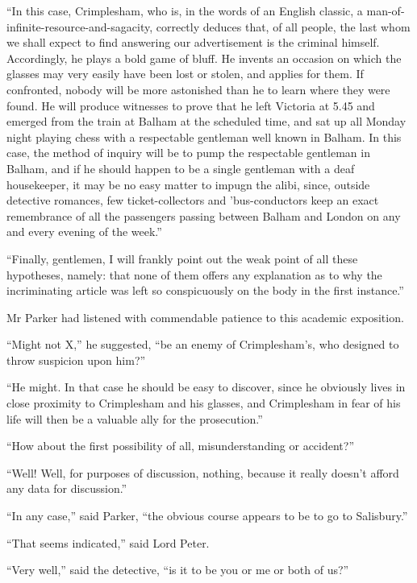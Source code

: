 \enquote{In this case, Crimplesham, who is, in the words of an English classic, a man-of-infinite-resource-and-sagacity, correctly deduces that, of all people, the last whom we shall expect to find answering our advertisement is the criminal himself. Accordingly, he plays a bold game of bluff. He invents an occasion on which the glasses may very easily have been lost or stolen, and applies for them. If confronted, nobody will be more astonished than he to learn where they were found. He will produce witnesses to prove that he left Victoria at 5.45 and emerged from the train at Balham at the scheduled time, and sat up all Monday night playing chess with a respectable gentleman well known in Balham. In this case, the method of inquiry will be to pump the respectable gentleman in Balham, and if he should happen to be a single gentleman with a deaf housekeeper, it may be no easy matter to impugn the alibi, since, outside detective romances, few ticket-collectors and ’bus-conductors keep an exact remembrance of all the passengers passing between Balham and London on any and every evening of the week.}

\enquote{Finally, gentlemen, I will frankly point out the weak point of all these hypotheses, namely: that none of them offers any explanation as to why the incriminating article was left so conspicuously on the body in the first instance.}

Mr Parker had listened with commendable patience to this academic exposition.

\enquote{Might not X,} he suggested, \enquote{be an enemy of Crimplesham’s, who designed to throw suspicion upon him?}

\enquote{He might. In that case he should be easy to discover, since he obviously lives in close proximity to Crimplesham and his glasses, and Crimplesham in fear of his life will then be a valuable ally for the prosecution.}

\enquote{How about the first possibility of all, misunderstanding or accident?}

\enquote{Well! Well, for purposes of discussion, nothing, because it really doesn’t afford any data for discussion.}

\enquote{In any case,} said Parker, \enquote{the obvious course appears to be to go to Salisbury.}

\enquote{That seems indicated,} said Lord Peter.

\enquote{Very well,} said the detective, \enquote{is it to be you or me or both of us?}

